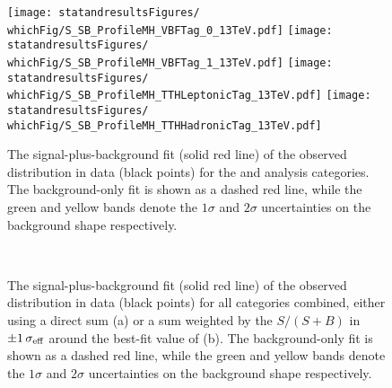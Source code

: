 \begin{figure}[p]
\centering
\texttt{[image: statandresultsFigures/\\whichFig/S\_SB\_ProfileMH\_VBFTag\_0\_13TeV.pdf]} 
\texttt{[image: statandresultsFigures/\\whichFig/S\_SB\_ProfileMH\_VBFTag\_1\_13TeV.pdf]} 
\texttt{[image: statandresultsFigures/\\whichFig/S\_SB\_ProfileMH\_TTHLeptonicTag\_13TeV.pdf]} 
\texttt{[image: statandresultsFigures/\\whichFig/S\_SB\_ProfileMH\_TTHHadronicTag\_13TeV.pdf]} \\
\caption{The signal-plus-background fit (solid red line) of the observed \mgg distribution in data (black points) for the \VBFTag and \TTHTag analysis categories. The background-only fit is shown as a dashed red line, while the green and yellow bands denote the $1\sigma$ and $2\sigma$ uncertainties on the background shape respectively.}

\label{fig:statandresults:s_b_fits_bis}
\end{figure}

\begin{figure}[hpt!]
\centering
{}\\
\caption{The signal-plus-background fit (solid red line) of the observed \mgg distribution in data (black points) for all categories combined, either using a direct sum (a) or a sum weighted by the $S/(S+B)$ in $\pm 1 \,\sigma_{\text{eff}}$ around the best-fit value of \mH (b). The background-only fit is shown as a dashed red line, while the green and yellow bands denote the $1\sigma$ and $2\sigma$ uncertainties on the background shape respectively.}

\label{fig:statandresults:s_b_fits_sum}
\end{figure}


